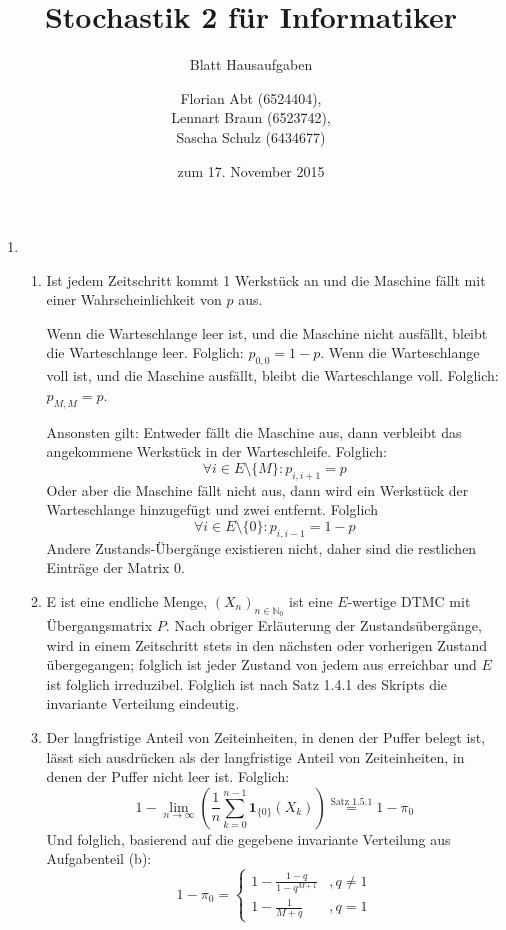 \documentclass[a4paper]{scrartcl}
\title{Stochastik 2 für Informatiker}
\subtitle{Blatt {\blattnr} Hausaufgaben}
\author{
    Florian Abt (6524404), \\
    Lennart Braun (6523742), \\
    Sascha Schulz (6434677)
}
\date{zum 17. November 2015}
\newcommand{\N}{\mathbb{N}}
\def \blattnr {5}
\begin{document}
\maketitle

\begin{enumerate}[label=\bfseries \blattnr.\arabic*]
    \item
        \begin{enumerate}
            \item
	    
	    Ist jedem Zeitschritt kommt 1 Werkstück an und die Maschine fällt mit einer Wahrscheinlichkeit von $p$ aus.
	    
	    Wenn die Warteschlange leer ist, und die Maschine nicht ausfällt, bleibt die Warteschlange leer. Folglich: $p_{0,0}=1-p$.
	    Wenn die Warteschlange voll ist, und die Maschine ausfällt, bleibt die Warteschlange voll. Folglich: $p_{M,M}=p$.

	    Ansonsten gilt: Entweder fällt die Maschine aus, dann verbleibt das angekommene Werkstück in der Warteschleife. 
	    Folglich: $$\forall i \in E\setminus\{M\} \colon p_{i,i+1} = p$$ 
	    Oder aber die Maschine fällt nicht aus, dann wird ein Werkstück der Warteschlange 
	    hinzugefügt und zwei entfernt. Folglich 
	    $$\forall i \in E\setminus\{0\} \colon p_{i,i-1} = 1 - p$$
	    Andere Zustands-Übergänge existieren nicht, daher sind die restlichen Einträge der Matrix 0.

            \item
            
            E ist eine endliche Menge, $(X_n)_{n\in\N_0}$ ist eine $E$-wertige
            DTMC mit Übergangsmatrix $P$. Nach obriger Erläuterung der Zustandsübergänge, wird in einem Zeitschritt stets in den nächsten 
            oder vorherigen Zustand übergegangen; folglich ist jeder Zustand von jedem aus erreichbar und $E$ ist folglich irreduzibel. 
            Folglich ist nach Satz 1.4.1 des Skripts die invariante Verteilung eindeutig.

            \item
            
            Der langfristige Anteil von Zeiteinheiten, in denen der Puffer belegt ist, lässt sich ausdrücken als der langfristige 
            Anteil von Zeiteinheiten, in denen der Puffer nicht leer ist. Folglich:
            \begin{equation*}
                1 - \lim_{n\to\infty} \left( \frac1n \sum_{k=0}^{n-1} \textbf{1}_{\{0\}}(X_k) \right) \stackrel{\text{Satz } 1.5.1}{=} 1 - \pi_0
            \end{equation*}
            Und folglich, basierend auf die gegebene invariante Verteilung aus Aufgabenteil (b):
            \begin{equation*}
	      1 - \pi_0 = \begin{cases}
			    1 - \frac{1-q}{1-q^{M+1}} &,q \neq 1 \\
			    1 - \frac1{M+q} &, q = 1
	                  \end{cases}
            \end{equation*}
            

\end{enumerate}
\end{enumerate}
\end{document}
